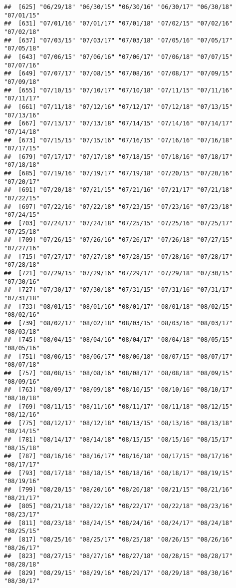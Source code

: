 \documentclass[]{article}
\begin{document}
\begin{verbatim}
##  [625] "06/29/18" "06/30/15" "06/30/16" "06/30/17" "06/30/18" "07/01/15"
##  [631] "07/01/16" "07/01/17" "07/01/18" "07/02/15" "07/02/16" "07/02/18"
##  [637] "07/03/15" "07/03/17" "07/03/18" "07/05/16" "07/05/17" "07/05/18"
##  [643] "07/06/15" "07/06/16" "07/06/17" "07/06/18" "07/07/15" "07/07/16"
##  [649] "07/07/17" "07/08/15" "07/08/16" "07/08/17" "07/09/15" "07/09/18"
##  [655] "07/10/15" "07/10/17" "07/10/18" "07/11/15" "07/11/16" "07/11/17"
##  [661] "07/11/18" "07/12/16" "07/12/17" "07/12/18" "07/13/15" "07/13/16"
##  [667] "07/13/17" "07/13/18" "07/14/15" "07/14/16" "07/14/17" "07/14/18"
##  [673] "07/15/15" "07/15/16" "07/16/15" "07/16/16" "07/16/18" "07/17/15"
##  [679] "07/17/17" "07/17/18" "07/18/15" "07/18/16" "07/18/17" "07/18/18"
##  [685] "07/19/16" "07/19/17" "07/19/18" "07/20/15" "07/20/16" "07/20/17"
##  [691] "07/20/18" "07/21/15" "07/21/16" "07/21/17" "07/21/18" "07/22/15"
##  [697] "07/22/16" "07/22/18" "07/23/15" "07/23/16" "07/23/18" "07/24/15"
##  [703] "07/24/17" "07/24/18" "07/25/15" "07/25/16" "07/25/17" "07/25/18"
##  [709] "07/26/15" "07/26/16" "07/26/17" "07/26/18" "07/27/15" "07/27/16"
##  [715] "07/27/17" "07/27/18" "07/28/15" "07/28/16" "07/28/17" "07/28/18"
##  [721] "07/29/15" "07/29/16" "07/29/17" "07/29/18" "07/30/15" "07/30/16"
##  [727] "07/30/17" "07/30/18" "07/31/15" "07/31/16" "07/31/17" "07/31/18"
##  [733] "08/01/15" "08/01/16" "08/01/17" "08/01/18" "08/02/15" "08/02/16"
##  [739] "08/02/17" "08/02/18" "08/03/15" "08/03/16" "08/03/17" "08/03/18"
##  [745] "08/04/15" "08/04/16" "08/04/17" "08/04/18" "08/05/15" "08/05/16"
##  [751] "08/06/15" "08/06/17" "08/06/18" "08/07/15" "08/07/17" "08/07/18"
##  [757] "08/08/15" "08/08/16" "08/08/17" "08/08/18" "08/09/15" "08/09/16"
##  [763] "08/09/17" "08/09/18" "08/10/15" "08/10/16" "08/10/17" "08/10/18"
##  [769] "08/11/15" "08/11/16" "08/11/17" "08/11/18" "08/12/15" "08/12/16"
##  [775] "08/12/17" "08/12/18" "08/13/15" "08/13/16" "08/13/18" "08/14/15"
##  [781] "08/14/17" "08/14/18" "08/15/15" "08/15/16" "08/15/17" "08/15/18"
##  [787] "08/16/16" "08/16/17" "08/16/18" "08/17/15" "08/17/16" "08/17/17"
##  [793] "08/17/18" "08/18/15" "08/18/16" "08/18/17" "08/19/15" "08/19/16"
##  [799] "08/20/15" "08/20/16" "08/20/18" "08/21/15" "08/21/16" "08/21/17"
##  [805] "08/21/18" "08/22/16" "08/22/17" "08/22/18" "08/23/16" "08/23/17"
##  [811] "08/23/18" "08/24/15" "08/24/16" "08/24/17" "08/24/18" "08/25/15"
##  [817] "08/25/16" "08/25/17" "08/25/18" "08/26/15" "08/26/16" "08/26/17"
##  [823] "08/27/15" "08/27/16" "08/27/18" "08/28/15" "08/28/17" "08/28/18"
##  [829] "08/29/15" "08/29/16" "08/29/17" "08/29/18" "08/30/16" "08/30/17"

\end{verbatim}
\end{document}
